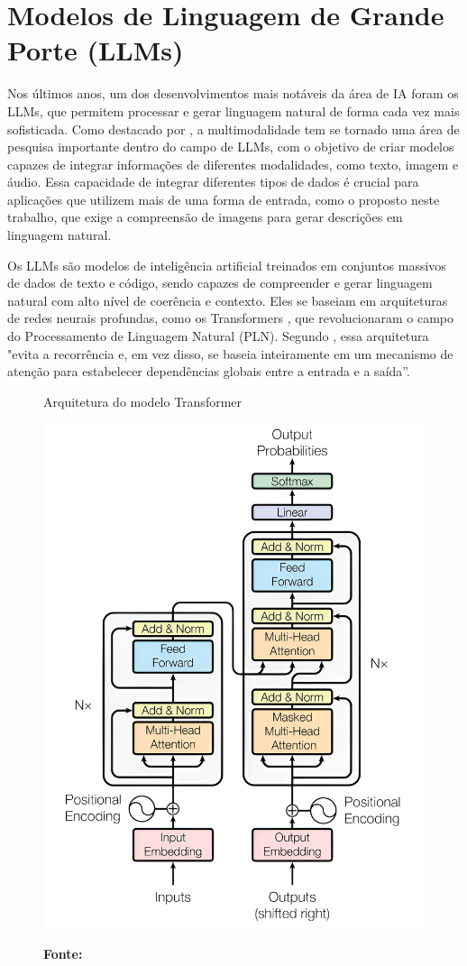 \section{Modelos de Linguagem de Grande Porte (LLMs)}

Nos últimos anos, um dos desenvolvimentos mais notáveis da área de IA foram os LLMs, que permitem processar e gerar linguagem natural de forma cada vez mais sofisticada. Como destacado por , a multimodalidade tem se tornado uma área de pesquisa importante dentro do campo de LLMs, com o objetivo de criar modelos capazes de integrar informações de diferentes modalidades, como texto, imagem e áudio. Essa capacidade de integrar diferentes tipos de dados é crucial para aplicações que utilizem mais de uma forma de entrada, como o proposto neste trabalho, que exige a compreensão de imagens para gerar descrições em linguagem natural.

Os LLMs são modelos de inteligência artificial treinados em conjuntos massivos de dados de texto e código, sendo capazes de compreender e gerar linguagem natural com alto nível de coerência e contexto.  Eles se baseiam em arquiteturas de redes neurais profundas, como os Transformers \cite{vaswani2017}, que revolucionaram o campo do Processamento de Linguagem Natural (PLN). Segundo , essa arquitetura "evita a recorrência e, em vez disso, se baseia inteiramente em um mecanismo de atenção para estabelecer dependências globais entre a entrada e a saída”. 


\begin{figure}[!h]
     \caption{Arquitetura do modelo Transformer}
     \centering
     \includegraphics[width=0.7\linewidth]{imagens/transformers-melhor.jpg}
     \label{fig:2}
     \caption*{\textbf{Fonte:} }
\end{figure}

